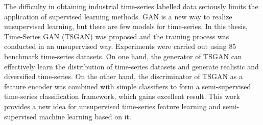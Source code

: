 \begin{eabstract}
The difficulty in obtaining industrial time-series labelled data seriously limits the application of supervised learning methods. GAN is a new way to realize unsupervised learning, but there are few models for time-series. In this thesis, Time-Series GAN (TSGAN) was proposed and the training process was conducted in an unsupervised way. Experiments were carried out using 85 benchmark time-series datasets. On one hand, the generator of TSGAN can effectively learn the distribution of time-series datasets and generate realistic and diversified time-series. On the other hand, the discriminator of TSGAN as a feature encoder was combined with simple classifiers to form a semi-supervised time-series classification framework, which gains excellent result. This work provides a new idea for unsupervised time-series feature learning and semi-supervised machine learning based on it.

\end{eabstract}

